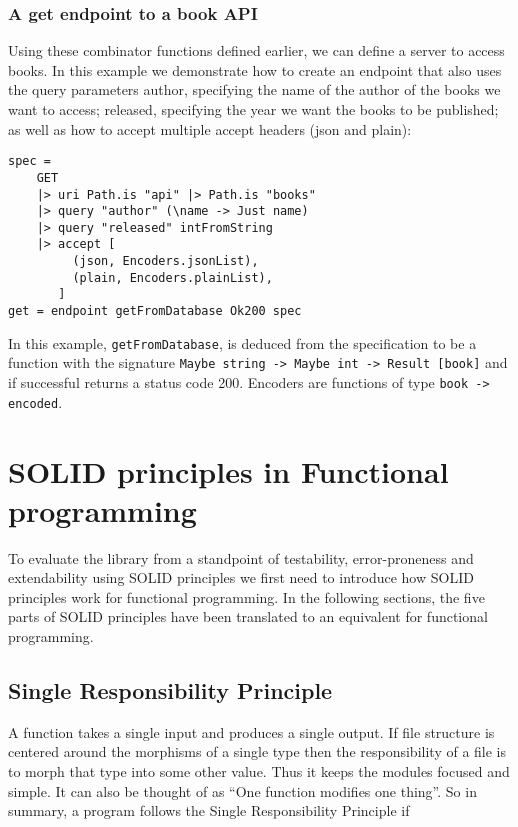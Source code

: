 \subsubsection{A get endpoint to a book API}

Using these combinator functions defined earlier, we can define a server to
access books. In this example we demonstrate how to create an endpoint that also
uses the query parameters author, specifying the name of the author of the books
we want to access; released, specifying the year we want the books to be
published; as well as how to accept multiple accept headers (json and plain):


\begin{lstlisting}
spec = 
    GET
    |> uri Path.is "api" |> Path.is "books"
    |> query "author" (\name -> Just name)
    |> query "released" intFromString
    |> accept [
         (json, Encoders.jsonList),
         (plain, Encoders.plainList),
       ]
get = endpoint getFromDatabase Ok200 spec
\end{lstlisting}

In this example, \texttt{getFromDatabase}, is deduced from the specification to
be a function with the signature \texttt{Maybe string -> Maybe int -> Result
[book]} and if successful returns a status code 200. Encoders are functions of
type \texttt{book -> encoded}. 

\section{SOLID principles in Functional programming}\label{dependencyinjection}

To evaluate the library from a standpoint of testability, error-proneness and
extendability using SOLID principles we first need to introduce how SOLID
principles work for functional programming. In the following sections, the five
parts of SOLID principles have been translated to an equivalent for functional
programming.

\subsection{Single Responsibility Principle}

A function takes a single input and produces a single output. If file structure
is centered around the morphisms of a single type then the responsibility of a
file is to morph that type into some other value. Thus it keeps the modules
focused and simple. It can also be thought of as ``One function modifies one
thing''. So in summary, a program follows the Single Responsibility Principle if 

